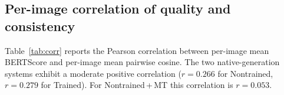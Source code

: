 \documentclass[11pt]{article}
\begin{document}
\subsection{Per-image correlation of quality and consistency}

Table~\ref{tab:corr} reports the Pearson correlation between per-image
mean BERTScore and per-image mean pairwise cosine. The two
native-generation systems exhibit a moderate positive correlation
($r\!=\!0.266$ for Nontrained, $r\!=\!0.279$ for Trained). For
Nontrained\,+\,MT this correlation is $r\!=\!0.053$.
\end{document}
